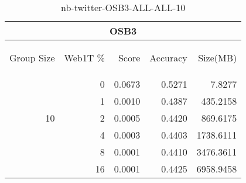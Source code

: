 \begin{center}
\begin{table}[htbp]
\begin{tabular}{ | r | r | r | r | r |}
\hline
\multicolumn{5}{|c|}{OSB3}\\
\hline
\begin{sideways}Group Size\end{sideways} & \begin{sideways}Web1T \%\end{sideways} & \begin{sideways}Score\end{sideways} & \begin{sideways}Accuracy\end{sideways} & \begin{sideways}Size(MB)\end{sideways}\\
\hline
\multirow{5}{*}{10}
 & 0 & 0.0673 & 0.5271 & 7.8277\\ \cline{2-5}
 & 1 & 0.0010 & 0.4387 & 435.2158\\ \cline{2-5}
 & 2 & 0.0005 & 0.4420 & 869.6175\\ \cline{2-5}
 & 4 & 0.0003 & 0.4403 & 1738.6111\\ \cline{2-5}
 & 8 & 0.0001 & 0.4410 & 3476.3611\\ \cline{2-5}
 & 16 & 0.0001 & 0.4425 & 6958.9458\\ \cline{2-5}
\hline
\end{tabular}
\caption{nb-twitter-OSB3-ALL-ALL-10}
\label{table:nb-twitter-OSB3-ALL-ALL-10}
\end{table}
\end{center}

